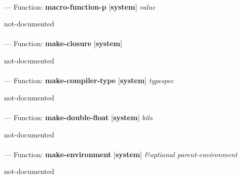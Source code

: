 \paragraph{}
\label{SYSTEM:MACRO-FUNCTION-P}
--- Function: \textbf{macro-function-p} [\textbf{system}] \textit{value}

\begin{adjustwidth}{5em}{5em}
not-documented
\end{adjustwidth}

\paragraph{}
\label{SYSTEM:MAKE-CLOSURE}
--- Function: \textbf{make-closure} [\textbf{system}] \textit{}

\begin{adjustwidth}{5em}{5em}
not-documented
\end{adjustwidth}

\paragraph{}
\label{SYSTEM:MAKE-COMPILER-TYPE}
--- Function: \textbf{make-compiler-type} [\textbf{system}] \textit{typespec}

\begin{adjustwidth}{5em}{5em}
not-documented
\end{adjustwidth}

\paragraph{}
\label{SYSTEM:MAKE-DOUBLE-FLOAT}
--- Function: \textbf{make-double-float} [\textbf{system}] \textit{bits}

\begin{adjustwidth}{5em}{5em}
not-documented
\end{adjustwidth}

\paragraph{}
\label{SYSTEM:MAKE-ENVIRONMENT}
--- Function: \textbf{make-environment} [\textbf{system}] \textit{\&optional parent-environment}

\begin{adjustwidth}{5em}{5em}
not-documented
\end{adjustwidth}

